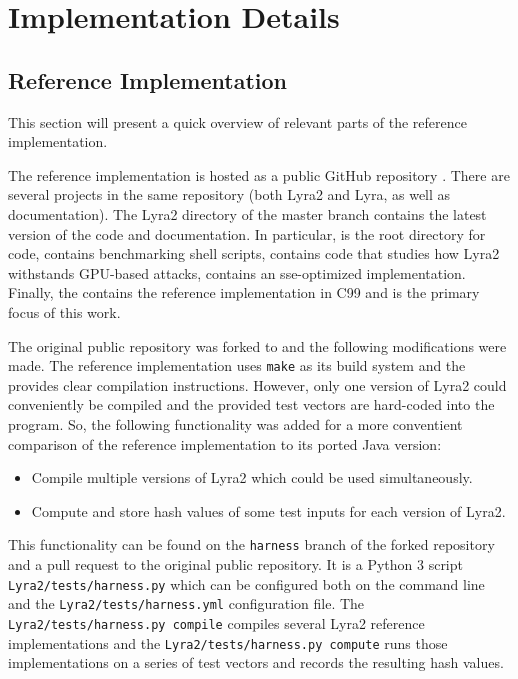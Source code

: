 \chapter{Implementation Details}

\section{Reference Implementation}
\label{sec:reference-implementation}

This section will present a quick overview of relevant parts of the reference implementation.

The reference implementation is hosted as a public GitHub repository \cite{github:2017:lyra}. There are several projects in the same repository (both Lyra2 and Lyra, as well as documentation). The Lyra2 directory of the master branch contains the latest version of the code and documentation. In particular,  is the root directory for code,  contains benchmarking shell scripts,  contains code that studies how Lyra2 withstands GPU-based attacks,  contains an sse-optimized implementation. Finally, the  contains the reference implementation in C99 and is the primary focus of this work.

The original public repository \cite{github:2017:lyra} was forked to \cite{github:2017:lyra-copy} and the following modifications were made. The reference implementation uses \verb|make| as its build system and the  provides clear compilation instructions. However, only one version of Lyra2 could conveniently be compiled and the provided test vectors are hard-coded into the program. So, the following functionality was added for a more conventient comparison of the reference implementation to its ported Java version:

\begin{itemize}
    \item Compile multiple versions of Lyra2 which could be used simultaneously.
    \item Compute and store hash values of some test inputs for each version of Lyra2.
  \end{itemize}

This functionality can be found on the \verb|harness| branch of the forked repository \cite{github:2017:lyra-copy} and a pull request \cite{github:2017:lyra-pr} to the original public repository. It is a Python 3 script \verb|Lyra2/tests/harness.py| which can be configured both on the command line and the \verb|Lyra2/tests/harness.yml| configuration file. The \verb|Lyra2/tests/harness.py compile| compiles several Lyra2 reference implementations and the \verb|Lyra2/tests/harness.py compute| runs those implementations on a series of test vectors and records the resulting hash values.

